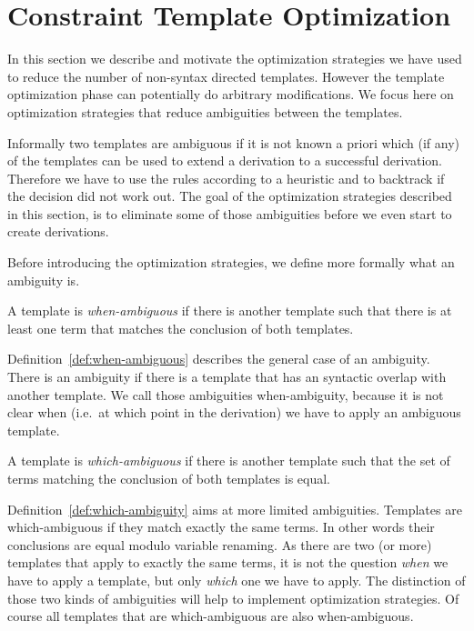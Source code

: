 \section{Constraint Template Optimization}
\label{sec:constr-templ-optim}
In this section we describe and motivate the optimization strategies
we have used to reduce the number of non-syntax directed
templates. However the template optimization phase can potentially do
arbitrary modifications. We focus here on optimization strategies that
reduce ambiguities between the templates.

Informally two templates are ambiguous if it is not known a priori
which (if any) of the templates can be used to extend a derivation to
a successful derivation. Therefore we have to use the rules according
to a heuristic and to backtrack if the decision did not work out. The
goal of the optimization strategies described in this section, is to
eliminate some of those ambiguities before we even start to create
derivations.

Before introducing the optimization strategies, we define more
formally what an ambiguity is.

\begin{definition}
  A template is \textit{when-ambiguous} if there is another template
  such that there is at least one term that matches the conclusion of
  both templates.
\label{def:when-ambiguous}
\end{definition}

Definition~\ref{def:when-ambiguous} describes the general case of an
ambiguity. There is an ambiguity if there is a template that has an
syntactic overlap with another template. We call those ambiguities
when-ambiguity, because it is not clear when (i.e.\ at which point in
the derivation) we have to apply an ambiguous template.

\begin{definition}
  A template is \textit{which-ambiguous} if there is another template
  such that the set of terms matching the conclusion of both templates
  is equal.
\label{def:which-ambiguity}
\end{definition}

Definition~\ref{def:which-ambiguity} aims at more limited
ambiguities. Templates are which-ambiguous if they match exactly the
same terms. In other words their conclusions are equal modulo variable
renaming. As there are two (or more) templates that apply to exactly
the same terms, it is not the question \textit{when} we have to apply
a template, but only \textit{which} one we have to apply. The
distinction of those two kinds of ambiguities will help to implement
optimization strategies. Of course all templates that are
which-ambiguous are also when-ambiguous.

